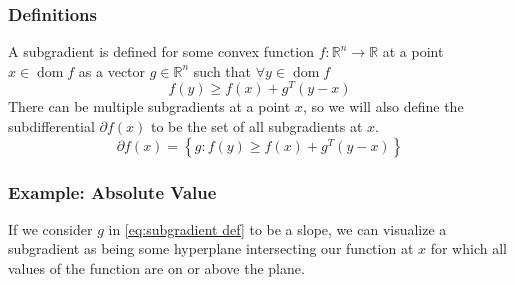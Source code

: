\documentclass[conference]{IEEEtran}
\DeclareMathOperator{\dom}{dom}
\begin{document}
\subsubsection{Definitions}
A subgradient is defined for some convex function \(f: \mathbb{R}^n \rightarrow \mathbb{R}\) at a point \(x \in \dom f\) as a vector \(g \in \mathbb{R}^n\) such that \(\forall y \in \dom f\)
\begin{equation}\label{eq:subgradient def}
f(y) \geq f(x) + g^T (y-x) 
\end{equation}
There can be multiple subgradients at a point \(x\), so we will also define the subdifferential \(\partial f(x)\) to be the set of all subgradients at \(x\).
\begin{equation}\label{eq:math subdifferential}
\partial f(x) = \left\{ g : f(y) \geq f(x) + g^T (y-x)\right\}
\end{equation}

\subsubsection{Example: Absolute Value}
If we consider \(g\) in \eqref{eq:subgradient def} to be a slope, we can visualize a subgradient as being some hyperplane intersecting our function at \(x\) for which all values of the function are on or above the plane. 
\end{document}
